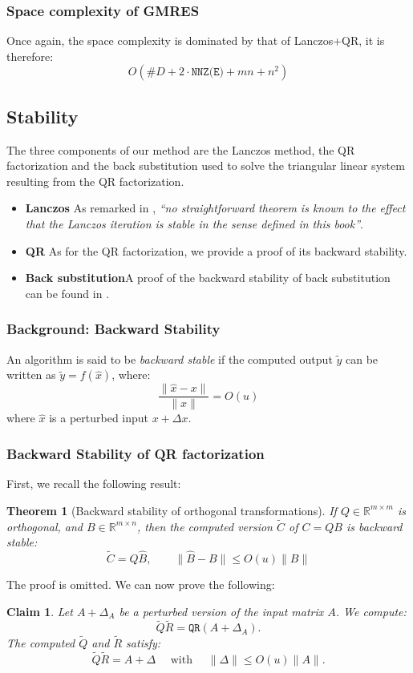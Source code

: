 \documentclass{article}
\newtheorem{claim}{Claim}
\newtheorem{theo}{Theorem}
\begin{document}
\subsubsection{Space complexity of GMRES}
Once again, the space complexity is dominated by that of Lanczos+QR, it is therefore:
\[O(\#D + 2\cdot \texttt{NNZ(E)} + mn + n^2)\]

\subsection{Stability}

The three components of our method are the Lanczos method, the QR factorization and the back substitution used to solve the triangular linear system resulting from the QR factorization.

\begin{itemize}
 \item \textbf{Lanczos} \quad As remarked in \cite{trefethen2022numerical}, \emph{``no straightforward theorem is known to the effect that the Lanczos iteration is stable in the sense defined in this book''}.
 \item \textbf{QR} \quad As for the QR factorization, we provide a proof of its backward stability.
 \item \textbf{Back substitution}\quad A proof of the backward stability of back substitution can be found in \cite{higham2002accuracy}.
\end{itemize}


\subsubsection{Background: Backward Stability}

An algorithm is said to be \emph{backward stable} if the computed output $\widetilde y$ can be written as $\widetilde y = f(\widehat x)$, where:
\[ \dfrac{\|\widehat x - x\|}{\|x\|} = O(u) \]
where $\widehat x$ is a perturbed input $x + \Delta x$.

\subsubsection{Backward Stability of QR factorization}

First, we recall the following result:
\begin{theo}[Backward stability of orthogonal transformations] \label{orthobs}
If $Q \in \mathbb R^{m \times m}$ is orthogonal, and $B \in \mathbb R^{m \times n}$, then the computed version $\widetilde C$ of $C = QB$ is backward stable:
\[ \widetilde C = Q\widehat B, \quad\quad \|\widehat B - B\| \leq O(u) \|B\| \]
\end{theo}
\noindent The proof is omitted. We can now prove the following:
\begin{framed}
\begin{claim}
Let $A + \Delta_A$ be a perturbed version of the input matrix $A$. We compute:
\[ \widetilde Q \widetilde R = \texttt{QR}(A + \Delta_A). \]
The computed $\widetilde Q$ and $\widetilde R$ satisfy:
 \[ \widetilde Q \widetilde R = A + \Delta \quad \text{ with  } \quad \|\Delta\| \leq O(u)\|A\|.\]
\end{claim}
\end{framed}
\end{document}

